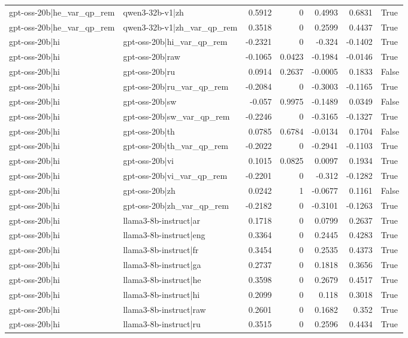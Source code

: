 \begin{table}
\begin{tabular}{l l r r r r l}
gpt-oss-20b|he_var_qp_rem & qwen3-32b-v1|zh & 0.5912 & 0 & 0.4993 & 0.6831 & True \\
gpt-oss-20b|he_var_qp_rem & qwen3-32b-v1|zh_var_qp_rem & 0.3518 & 0 & 0.2599 & 0.4437 & True \\
gpt-oss-20b|hi & gpt-oss-20b|hi_var_qp_rem & -0.2321 & 0 & -0.324 & -0.1402 & True \\
gpt-oss-20b|hi & gpt-oss-20b|raw & -0.1065 & 0.0423 & -0.1984 & -0.0146 & True \\
gpt-oss-20b|hi & gpt-oss-20b|ru & 0.0914 & 0.2637 & -0.0005 & 0.1833 & False \\
gpt-oss-20b|hi & gpt-oss-20b|ru_var_qp_rem & -0.2084 & 0 & -0.3003 & -0.1165 & True \\
gpt-oss-20b|hi & gpt-oss-20b|sw & -0.057 & 0.9975 & -0.1489 & 0.0349 & False \\
gpt-oss-20b|hi & gpt-oss-20b|sw_var_qp_rem & -0.2246 & 0 & -0.3165 & -0.1327 & True \\
gpt-oss-20b|hi & gpt-oss-20b|th & 0.0785 & 0.6784 & -0.0134 & 0.1704 & False \\
gpt-oss-20b|hi & gpt-oss-20b|th_var_qp_rem & -0.2022 & 0 & -0.2941 & -0.1103 & True \\
gpt-oss-20b|hi & gpt-oss-20b|vi & 0.1015 & 0.0825 & 0.0097 & 0.1934 & True \\
gpt-oss-20b|hi & gpt-oss-20b|vi_var_qp_rem & -0.2201 & 0 & -0.312 & -0.1282 & True \\
gpt-oss-20b|hi & gpt-oss-20b|zh & 0.0242 & 1 & -0.0677 & 0.1161 & False \\
gpt-oss-20b|hi & gpt-oss-20b|zh_var_qp_rem & -0.2182 & 0 & -0.3101 & -0.1263 & True \\
gpt-oss-20b|hi & llama3-8b-instruct|ar & 0.1718 & 0 & 0.0799 & 0.2637 & True \\
gpt-oss-20b|hi & llama3-8b-instruct|eng & 0.3364 & 0 & 0.2445 & 0.4283 & True \\
gpt-oss-20b|hi & llama3-8b-instruct|fr & 0.3454 & 0 & 0.2535 & 0.4373 & True \\
gpt-oss-20b|hi & llama3-8b-instruct|ga & 0.2737 & 0 & 0.1818 & 0.3656 & True \\
gpt-oss-20b|hi & llama3-8b-instruct|he & 0.3598 & 0 & 0.2679 & 0.4517 & True \\
gpt-oss-20b|hi & llama3-8b-instruct|hi & 0.2099 & 0 & 0.118 & 0.3018 & True \\
gpt-oss-20b|hi & llama3-8b-instruct|raw & 0.2601 & 0 & 0.1682 & 0.352 & True \\
gpt-oss-20b|hi & llama3-8b-instruct|ru & 0.3515 & 0 & 0.2596 & 0.4434 & True \\

\end{tabular}
\end{table}
